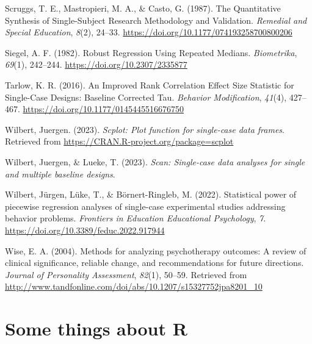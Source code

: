 \documentclass[
  letterpaper,
  DIV=11,
  numbers=noendperiod]{scrreprt}
\newlength{\cslhangindent}
\newlength{\cslentryspacingunit} %
\newenvironment{CSLReferences}[2] %
 {%
  \setlength{\parindent}{0pt}
  \ifodd #1
  \let\oldpar\par
  \def\par{\hangindent=\cslhangindent\oldpar}
  \fi
  \setlength{\parskip}{#2\cslentryspacingunit}
 }%
 {}
\begin{document}
\begin{CSLReferences}{1}{0}
\leavevmode{}%
Scruggs, T. E., Mastropieri, M. A., \& Casto, G. (1987). The
{Quantitative} {Synthesis} of {Single}-{Subject} {Research}
{Methodology} and {Validation}. \emph{Remedial and Special Education},
\emph{8}(2), 24--33. \url{https://doi.org/10.1177/074193258700800206}

\leavevmode{}%
Siegel, A. F. (1982). Robust {Regression Using Repeated Medians}.
\emph{Biometrika}, \emph{69}(1), 242--244.
\url{https://doi.org/10.2307/2335877}

\leavevmode{}%
Tarlow, K. R. (2016). An {Improved Rank Correlation Effect Size
Statistic} for {Single}-{Case Designs}: Baseline {Corrected Tau}.
\emph{Behavior Modification}, \emph{41}(4), 427--467.
\url{https://doi.org/10.1177/0145445516676750}

\leavevmode{}%
Wilbert, Juergen. (2023). \emph{Scplot: Plot function for single-case
data frames}. Retrieved from
\url{https://CRAN.R-project.org/package=scplot}

\leavevmode{}%
Wilbert, Juergen, \& Lueke, T. (2023). \emph{Scan: Single-case data
analyses for single and multiple baseline designs}.

\leavevmode{}%
Wilbert, Jürgen, Lüke, T., \& Börnert-Ringleb, M. (2022). Statistical
power of piecewise regression analyses of single-case experimental
studies addressing behavior problems. \emph{Frontiers in Education
Educational Psychology}, \emph{7}.
\url{https://doi.org/10.3389/feduc.2022.917944}

\leavevmode{}%
Wise, E. A. (2004). Methods for analyzing psychotherapy outcomes: {A}
review of clinical significance, reliable change, and recommendations
for future directions. \emph{Journal of Personality Assessment},
\emph{82}(1), 50--59. Retrieved from
\url{http://www.tandfonline.com/doi/abs/10.1207/s15327752jpa8201_10}

\end{CSLReferences}

\appendix
{}

\hypertarget{sec-R}{%
\chapter{Some things about R}\label{sec-R}}
\end{document}
